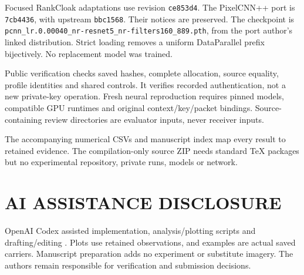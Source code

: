 \documentclass[a4paper,twoside]{article}
\begin{document}
Focused RankCloak adaptations use revision \texttt{ce853d4}. The PixelCNN++ port is \texttt{7cb4436}, with upstream \texttt{bbc1568}. Their notices are preserved. The checkpoint is \texttt{pcnn\_lr.0.00040\_}\allowbreak\texttt{nr-resnet5\_}\allowbreak\texttt{nr-filters160\_889.pth}, from the port author's linked distribution. Strict loading removes a uniform DataParallel prefix bijectively. No replacement model was trained.

Public verification checks saved hashes, complete allocation, source equality, profile identities and shared controls. It verifies recorded authentication, not a new private-key operation. Fresh neural reproduction requires pinned models, compatible GPU runtimes and original context/key/packet bindings. Source-containing review directories are evaluator inputs, never receiver inputs.

The accompanying numerical CSVs and manuscript index map every result to retained evidence. The compilation-only source ZIP needs standard TeX packages but no experimental repository, private runs, models or network.

\section*{\uppercase{AI Assistance Disclosure}}
OpenAI Codex assisted implementation, analysis/plotting scripts and drafting/editing \cite{codex}. Plots use retained observations, and examples are actual saved carriers. Manuscript preparation adds no experiment or substitute imagery. The authors remain responsible for verification and submission decisions.

{\small}
\end{document}
